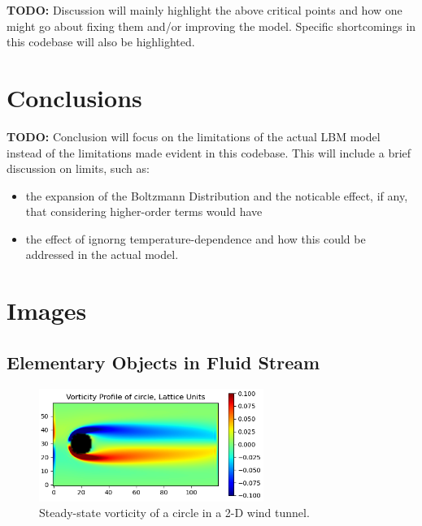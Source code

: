 \documentclass[twoside]{article}
\begin{document}
\noindent \textbf{TODO:} Discussion will mainly highlight the above critical points and how one might go about fixing them and/or improving the model. Specific shortcomings in this codebase will also be highlighted.\\



\section{Conclusions}

\noindent \textbf{TODO:} Conclusion will focus on the limitations of the actual LBM model instead of the limitations made evident in this codebase. This will include a brief discussion on limits, such as:

\begin{itemize}
\item the expansion of the Boltzmann Distribution and the noticable effect, if any, that considering higher-order terms would have
\item the effect of ignorng temperature-dependence and how this could be addressed in the actual model.
\end{itemize}



\newpage

\appendix
\appendixpage
\section{Images}

\subsection{Elementary Objects in Fluid Stream}
\label{ssec:ObjsInStream}

\begin{centering}
\begin{figure}[H]
\centering
\graphicspath{ {stream_images/} }
\includegraphics[width=0.65\textwidth]{final_circle.png}
\captionsetup{format = hang, width = 0.8\textwidth}
\caption{Steady-state vorticity of a circle in a 2-D wind tunnel.}
\label{fig:FinalCircle}
\end{figure}
\end{centering}
\end{document}
